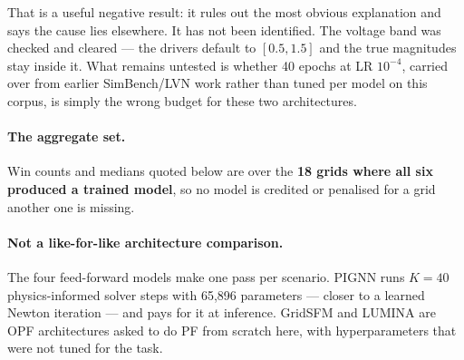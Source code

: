 \documentclass[10pt]{article}
\begin{document}
That is a useful negative result: it rules out the most obvious explanation and
says the cause lies elsewhere. It has not been identified. The voltage band was
checked and cleared --- the drivers default to $[0.5, 1.5]$ and the true
magnitudes stay inside it. What remains untested is whether 40 epochs at
LR $10^{-4}$, carried over from earlier SimBench/LVN work rather than tuned per
model on this corpus, is simply the wrong budget for these two architectures.

\paragraph{The aggregate set.} Win counts and medians quoted below are over the
\textbf{18 grids where all six produced a trained model}, so no model is
credited or penalised for a grid another one is missing.

\paragraph{Not a like-for-like architecture comparison.} The four feed-forward
models make one pass per scenario. PIGNN runs $K=40$ physics-informed solver
steps with 65{,}896 parameters --- closer to a learned Newton iteration --- and
pays for it at inference. GridSFM and LUMINA are OPF architectures asked to do
PF from scratch here, with hyperparameters that were not tuned for the task.
\end{document}

